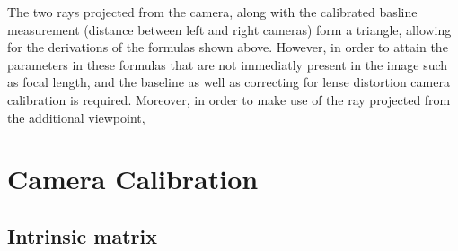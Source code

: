 \documentclass[11pt]{scrartcl}
\begin{document}
The two rays projected from the camera, along with the calibrated basline measurement (distance
between left and right cameras) form a triangle, allowing for the derivations of the formulas
shown above. However, in order to attain the parameters in these formulas that are not 
immediatly present in the image such as focal length, and the baseline as well as correcting
for lense distortion camera calibration is required. Moreover, in order to make use of the ray 
projected from the additional viewpoint, 


\section{Camera Calibration}

\subsection{Intrinsic matrix}
\end{document}
